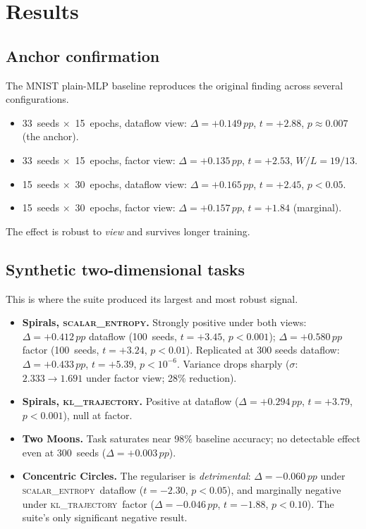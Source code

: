 \documentclass[11pt,a4paper]{article}
\newcommand{\pp}{\,pp\xspace}
\newcommand{\scalarH}{\textsc{scalar\_entropy}\xspace}
\newcommand{\klT}{\textsc{kl\_trajectory}\xspace}
\begin{document}
\section{Results}

\subsection{Anchor confirmation}

The MNIST plain-MLP baseline reproduces the original finding across
several configurations.
\begin{itemize}
  \item 33~seeds $\times$~15~epochs, dataflow view: $\Delta=+0.149\pp$,
    $t=+2.88$, $p\approx 0.007$ (the anchor).
  \item 33~seeds $\times$~15~epochs, factor view: $\Delta=+0.135\pp$,
    $t=+2.53$, $W/L=19/13$.
  \item 15~seeds $\times$~30~epochs, dataflow view: $\Delta=+0.165\pp$,
    $t=+2.45$, $p<0.05$.
  \item 15~seeds $\times$~30~epochs, factor view: $\Delta=+0.157\pp$,
    $t=+1.84$ (marginal).
\end{itemize}
The effect is robust to \emph{view} and survives longer training.

\subsection{Synthetic two-dimensional tasks}

This is where the suite produced its largest and most robust signal.

\begin{itemize}
  \item \textbf{Spirals, \scalarH.} Strongly positive under both views:
    $\Delta=+0.412\pp$ dataflow (100~seeds, $t=+3.45$, $p<0.001$);
    $\Delta=+0.580\pp$ factor (100~seeds, $t=+3.24$, $p<0.01$).
    Replicated at 300 seeds dataflow: $\Delta=+0.433\pp$, $t=+5.39$,
    $p<10^{-6}$. Variance drops sharply ($\sigma$: $2.333\!\to\!1.691$
    under factor view; 28\% reduction).
  \item \textbf{Spirals, \klT.} Positive at dataflow
    ($\Delta=+0.294\pp$, $t=+3.79$, $p<0.001$), null at factor.
  \item \textbf{Two Moons.} Task saturates near 98\% baseline accuracy;
    no detectable effect even at 300~seeds ($\Delta=+0.003\pp$).
  \item \textbf{Concentric Circles.} The regulariser is
    \emph{detrimental}: $\Delta=-0.060\pp$ under \scalarH\ dataflow
    ($t=-2.30$, $p<0.05$), and marginally negative under \klT\ factor
    ($\Delta=-0.046\pp$, $t=-1.88$, $p<0.10$). The suite's only
    significant negative result.
\end{itemize}
\end{document}
